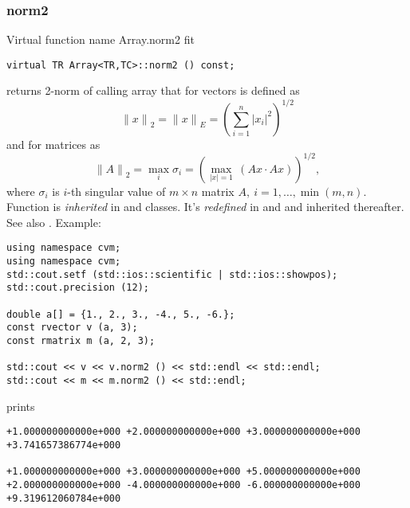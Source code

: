 \subsubsection{norm2}
Virtual function%
\pdfdest name {Array.norm2} fit
\begin{verbatim}
virtual TR Array<TR,TC>::norm2 () const;
\end{verbatim}
returns  2-norm of calling array that for vectors
is defined as
\begin{equation*}
{\|x\|}_2={\|x\|}_E=\left(\sum_{i=1}^{n} |x_i|^2\right)^{1/2}
\end{equation*}
and for matrices as
\begin{equation*}
{\|A\|}_2=\max_i\sigma_i = \left(\max_{|x|=1}\,
(Ax\cdot Ax)\right)^{1/2},
\end{equation*}
where $\sigma_i$ is  \hbox{$i$-th} singular value
of $m\times n$ matrix $A,\ i=1,\dots,\min(m,n)$.
Function is \emph{inherited} in
 and  classes.
It's \emph{redefined} in
 and 
and inherited thereafter.
See also .
Example:
\begin{Verbatim}
using namespace cvm;
using namespace cvm;
std::cout.setf (std::ios::scientific | std::ios::showpos);
std::cout.precision (12);

double a[] = {1., 2., 3., -4., 5., -6.};
const rvector v (a, 3);
const rmatrix m (a, 2, 3);

std::cout << v << v.norm2 () << std::endl << std::endl;
std::cout << m << m.norm2 () << std::endl;
\end{Verbatim}
prints
\begin{Verbatim}
+1.000000000000e+000 +2.000000000000e+000 +3.000000000000e+000
+3.741657386774e+000

+1.000000000000e+000 +3.000000000000e+000 +5.000000000000e+000
+2.000000000000e+000 -4.000000000000e+000 -6.000000000000e+000
+9.319612060784e+000
\end{Verbatim}
\newpage



